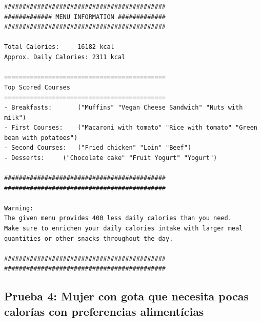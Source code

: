 \documentclass[11]{article}
\begin{document}
\begin{lstlisting}[frame=single]
############################################
############# MENU INFORMATION #############
############################################

Total Calories:		16182 kcal
Approx. Daily Calories:	2311 kcal

============================================
Top Scored Courses
============================================
- Breakfasts:		("Muffins" "Vegan Cheese Sandwich" "Nuts with milk")
- First Courses:	("Macaroni with tomato" "Rice with tomato" "Green bean with potatoes")
- Second Courses:	("Fried chicken" "Loin" "Beef")
- Desserts:		("Chocolate cake" "Fruit Yogurt" "Yogurt")

############################################
############################################

Warning:
The given menu provides 400 less daily calories than you need.
Make sure to enrichen your daily calories intake with larger meal quantities or other snacks throughout the day.

############################################
############################################
\end{lstlisting}

\subsection{Prueba 4: Mujer con gota que necesita pocas calorías con preferencias alimentícias}
\end{document}
